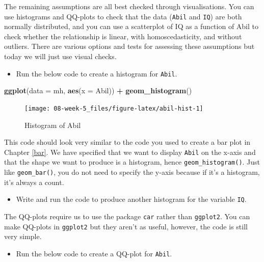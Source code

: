 \documentclass[]{book}
\newenvironment{Shaded}{\begin{snugshade}}{\end{snugshade}}
\newcommand{\DataTypeTok}[1]{\textcolor[rgb]{0.13,0.29,0.53}{#1}}
\newcommand{\KeywordTok}[1]{\textcolor[rgb]{0.13,0.29,0.53}{\textbf{#1}}}
\newcommand{\NormalTok}[1]{#1}
\newcommand{\OperatorTok}[1]{\textcolor[rgb]{0.81,0.36,0.00}{\textbf{#1}}}
\newcommand{\StringTok}[1]{\textcolor[rgb]{0.31,0.60,0.02}{#1}}
\providecommand{\tightlist}{%
  \setlength{\itemsep}{0pt}\setlength{\parskip}{0pt}}
\begin{document}
The remaining assumptions are all best checked through visualisations. You can use histograms and QQ-plots to check that the data (\texttt{Abil} and \texttt{IQ}) are both normally distributed, and you can use a scatterplot of IQ as a function of Abil to check whether the relationship is linear, with homoscedasticity, and without outliers. There are various options and tests for assessing these assumptions but today we will just use visual checks.

\begin{itemize}
\tightlist
\item
  Run the below code to create a histogram for \texttt{Abil}.
\end{itemize}

\begin{Shaded}
\begin{Highlighting}[]
\KeywordTok{ggplot}\NormalTok{(}\DataTypeTok{data =}\NormalTok{ mh, }\KeywordTok{aes}\NormalTok{(}\DataTypeTok{x =}\NormalTok{ Abil)) }\OperatorTok{+}
\StringTok{  }\KeywordTok{geom_histogram}\NormalTok{()}
\end{Highlighting}
\end{Shaded}

\begin{figure}

{\centering \texttt{[image: 08-week-5\_files/figure-latex/abil-hist-1]} 

}

\caption{Histogram of Abil}\label{fig:abil-hist}
\end{figure}

This code should look very similar to the code you used to create a bar plot in Chapter \ref{bar}. We have specified that we want to display \texttt{Abil} on the x-axis and that the shape we want to produce is a histogram, hence \texttt{geom\_histogram()}. Just like \texttt{geom\_bar()}, you do not need to specify the y-axis because if it's a histogram, it's always a count.

\begin{itemize}
\tightlist
\item
  Write and run the code to produce another histogram for the variable \texttt{IQ}.
\end{itemize}

The QQ-plots require us to use the package \texttt{car} rather than \texttt{ggplot2}. You can make QQ-plots in \texttt{ggplot2} but they aren't as useful, however, the code is still very simple.

\begin{itemize}
\tightlist
\item
  Run the below code to create a QQ-plot for \texttt{Abil}.
\end{itemize}
\end{document}
